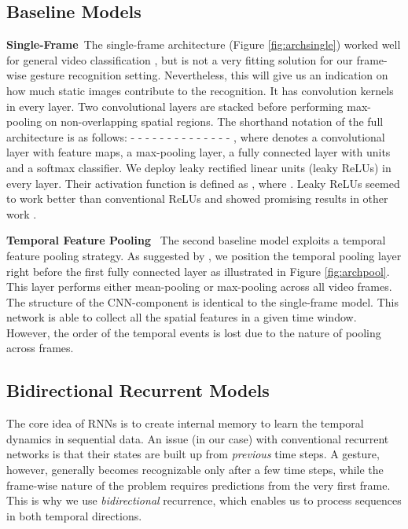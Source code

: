 \documentclass[11pt,a4paper]{article} \usepackage{a4wide}
\begin{document}
\subsection{Baseline Models}



\textbf{Single-Frame}\, The single-frame architecture (Figure \ref{fig:archsingle}) worked well for general video classification \citep{karpathy2014large}, but is not a very fitting solution for our frame-wise gesture recognition setting. Nevertheless, this will give us an indication on how much static images contribute to the recognition. It has  convolution kernels in every layer. Two convolutional layers are stacked before performing max-pooling on non-overlapping  spatial regions. The shorthand notation of the full architecture is as follows:  -  -  -  -  -  -  -  -  -  -  -  -  -  - , where  denotes a convolutional layer with  feature maps,  a max-pooling layer,  a fully connected layer with  units and  a softmax classifier. We deploy leaky rectified linear units (leaky ReLUs) in every layer. Their activation function is defined as , where . Leaky ReLUs seemed to work better than conventional ReLUs and showed promising results in other work \citep{maas2013rectifier,graham2014spatially,ndsb,xu2015empirical}. 




\textbf{Temporal Feature Pooling} \, The second baseline model exploits a temporal feature pooling strategy. As suggested by \cite{ng2015beyond}, we position the temporal pooling layer right before the first fully connected layer as illustrated in Figure \ref{fig:archpool}. This layer performs either mean-pooling or max-pooling across all video frames. The structure of the CNN-component is identical to the single-frame model. This network is able to collect all the spatial features in a given time window. However, the order of the temporal events is lost due to the nature of pooling across frames.





\subsection{Bidirectional Recurrent Models} \label{sec:rnn}


The core idea of RNNs is to create internal memory to learn the temporal dynamics in sequential data. 
An issue (in our case) with conventional recurrent networks is that their states are built up from \emph{previous} time steps. A gesture, however, generally becomes recognizable only after a few time steps, while the frame-wise nature of the problem requires predictions from the very first frame. This is why we use \emph{bidirectional} recurrence, which enables us to process sequences in both temporal directions. 
\end{document}
